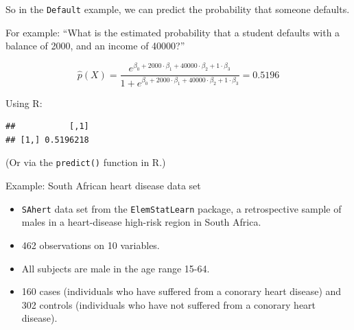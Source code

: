 \documentclass[10pt,ignorenonframetext,]{beamer}
\newenvironment{Shaded}{\begin{snugshade}}{\end{snugshade}}
\newcommand{\KeywordTok}[1]{\textcolor[rgb]{0.13,0.29,0.53}{\textbf{#1}}}
\newcommand{\DecValTok}[1]{\textcolor[rgb]{0.00,0.00,0.81}{#1}}
\newcommand{\StringTok}[1]{\textcolor[rgb]{0.31,0.60,0.02}{#1}}
\newcommand{\OperatorTok}[1]{\textcolor[rgb]{0.81,0.36,0.00}{\textbf{#1}}}
\newcommand{\NormalTok}[1]{#1}
\begin{document}
\begin{frame}[fragile]

So in the \texttt{Default} example, we can predict the probability that
someone defaults.

For example: ``What is the estimated probability that a student defaults
with a balance of 2000, and an income of 40000?''

\[\hat{p}(X) = \frac{e^{\beta_0 + 2000 \cdot \beta_1 + 40000 \cdot \beta_2 + 1 \cdot \beta_3}}{ 1+  e^{\beta_0 + 2000 \cdot \beta_1 + 40000 \cdot \beta_2 + 1 \cdot \beta_3}} = 0.5196\]
\vspace{6mm}

Using R: \scriptsize

\begin{Shaded}
\end{Shaded}

\begin{verbatim}
##           [,1]
## [1,] 0.5196218
\end{verbatim}

\normalsize
(Or via the \texttt{predict()} function in R.)

\end{frame}

\begin{frame}[fragile]

\begin{block}{Example: South African heart disease data set}

\vspace{2mm}

\begin{itemize}
\item
  \texttt{SAhert} data set from the \texttt{ElemStatLearn} package, a
  retrospective sample of males in a heart-disease high-risk region in
  South Africa.
\item
  462 observations on 10 variables.
\item
  All subjects are male in the age range 15-64.
\item
  160 cases (individuals who have suffered from a conorary heart
  disease) and 302 controls (individuals who have not suffered from a
  conorary heart disease).
\end{itemize}

\end{block}

\end{frame}
\end{document}

